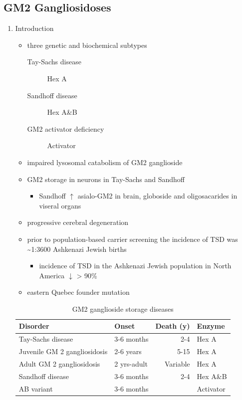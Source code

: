 \documentclass{scrartcl}
\begin{document}
\subsection{GM2 Gangliosidoses}
\label{sec:org03a3cc7}
\begin{enumerate}
\item Introduction
\label{sec:orga6e54a0}
\begin{itemize}
\item three genetic and biochemical subtypes
\begin{description}
\item[{Tay-Sachs disease}] Hex A
\item[{Sandhoff disease}] Hex A\&B
\item[{GM2 activator deficiency}] Activator
\end{description}
\item impaired lysosomal catabolism of GM2 ganglioside
\item GM2 storage in neurons in Tay-Sachs and Sandhoff
\begin{itemize}
\item Sandhoff \(\uparrow\) asialo-GM2 in brain, globoside and oligosacarides in viseral organs
\end{itemize}
\item progressive cerebral degeneration
\item prior to population-based carrier screening the incidence of TSD was \textasciitilde{}1:3600 Ashkenazi Jewish births
\begin{itemize}
\item incidence of TSD in the Ashkenazi Jewish population in North America \(\downarrow\) > 90\%
\end{itemize}
\item eastern Quebec founder mutation
\end{itemize}

\begin{table}[htbp]
\caption{\label{tab:orgf1149fc}
GM2 ganglioside storage diseases}
\centering
\begin{tabular}{llrl}
Disorder & Onset & Death (y) & Enzyme\\
\hline
Tay-Sachs disease & 3-6 months & 2-4 & Hex A\\
Juvenile GM 2 gangliosidosis & 2-6 years & 5-15 & Hex A\\
Adult GM 2 gangliosidosis & 2 yrs-adult & Variable & Hex A\\
\hline
Sandhoff disease & 3-6 months & 2-4 & Hex A\&B\\
AB variant & 3-6 months &  & Activator\\
\end{tabular}
\end{table}


\end{enumerate}
\end{document}
